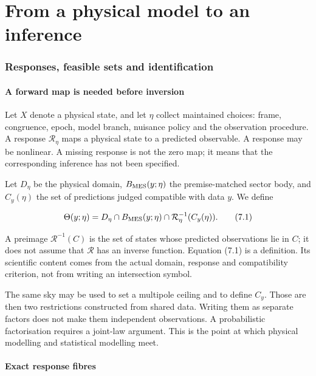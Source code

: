 \documentclass[
  11pt,
  a4paper]{article}
\begin{document}
\part{From a physical model to an inference}

\hypertarget{responses-feasible-sets-and-identification}{%
\section{Responses, feasible sets and identification}\label{responses-feasible-sets-and-identification}}

\hypertarget{a-forward-map-is-needed-before-inversion}{%
\subsection{A forward map is needed before inversion}\label{a-forward-map-is-needed-before-inversion}}

Let \(X\) denote a physical state, and let \(\eta\) collect maintained choices: frame, congruence, epoch, model branch, nuisance policy and the observation procedure. A response \(\mathcal R_\eta\) maps a physical state to a predicted observable. A response may be nonlinear. A missing response is not the zero map; it means that the corresponding inference has not been specified.

Let \(D_\eta\) be the physical domain, \(B_{\rm MES}(y;\eta)\) the premise-matched sector body, and \(C_y(\eta)\) the set of predictions judged compatible with data \(y\). We define

\[
\Theta(y;\eta)
=D_\eta\cap B_{\rm MES}(y;\eta)
\cap\mathcal R_\eta^{-1}(C_y(\eta)).
\tag{7.1}
\]

A preimage \(\mathcal R^{-1}(C)\) is the set of states whose predicted observations lie in \(C\); it does not assume that \(\mathcal R\) has an inverse function. Equation (7.1) is a definition. Its scientific content comes from the actual domain, response and compatibility criterion, not from writing an intersection symbol.

The same sky may be used to set a multipole ceiling and to define \(C_y\). Those are then two restrictions constructed from shared data. Writing them as separate factors does not make them independent observations. A probabilistic factorisation requires a joint-law argument. This is the point at which physical modelling and statistical modelling meet.

\hypertarget{exact-response-fibres}{%
\subsection{Exact response fibres}\label{exact-response-fibres}}
\end{document}
